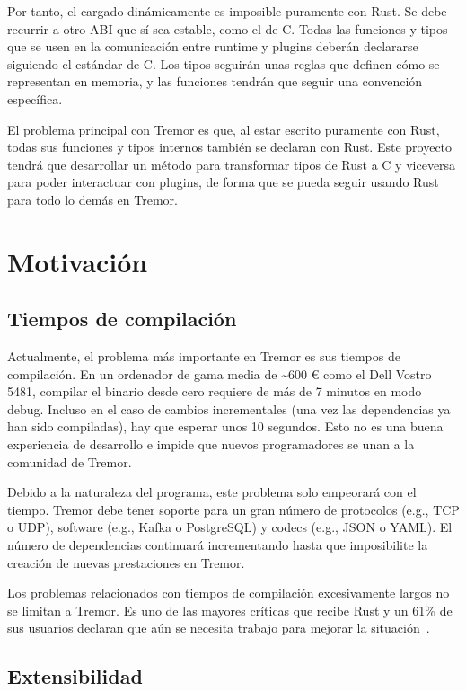 Por tanto, el cargado dinámicamente es imposible puramente con Rust. Se debe
recurrir a otro ABI que sí sea estable, como el de C. Todas las funciones y
tipos que se usen en la comunicación entre runtime y plugins deberán declararse
siguiendo el estándar de C. Los tipos seguirán unas reglas que definen cómo se
representan en memoria, y las funciones tendrán que seguir una convención
específica.

El problema principal con Tremor es que, al estar escrito puramente con Rust,
todas sus funciones y tipos internos también se declaran con Rust. Este proyecto
tendrá que desarrollar un método para transformar tipos de Rust a C y viceversa
para poder interactuar con plugins, de forma que se pueda seguir usando Rust
para todo lo demás en Tremor.

\section{Motivación}

\subsection{Tiempos de compilación}

Actualmente, el problema más importante en Tremor es sus tiempos de compilación.
En un ordenador de gama media de \~{}600 € como el Dell Vostro 5481, compilar el
binario  desde cero requiere de más de 7 minutos en modo debug.
Incluso en el caso de cambios incrementales (una vez las dependencias ya han
sido compiladas), hay que esperar unos 10 segundos. Esto no es una buena
experiencia de desarrollo e impide que nuevos programadores se unan a la
comunidad de Tremor.

Debido a la naturaleza del programa, este problema solo empeorará con el tiempo.
Tremor debe tener soporte para un gran número de protocolos (e.g., TCP o UDP),
software (e.g., Kafka o PostgreSQL) y codecs (e.g., JSON o YAML). El número de
dependencias continuará incrementando hasta que imposibilite la creación de
nuevas prestaciones en Tremor.

Los problemas relacionados con tiempos de compilación excesivamente largos no se
limitan a Tremor. Es uno de las mayores críticas que recibe Rust y un 61\% de
sus usuarios declaran que aún se necesita trabajo para mejorar la
situación~\cite{rustsurvey}.

\subsection{Extensibilidad}

